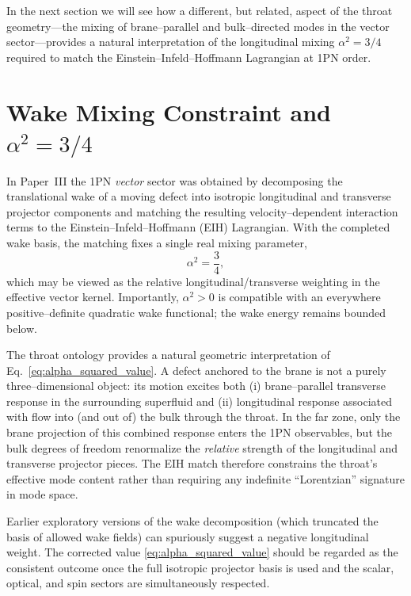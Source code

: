 \documentclass[12pt]{article}
\begin{document}
In the next section we will see how a different, but related, aspect of the
throat geometry---the mixing of brane--parallel and bulk--directed modes in
the vector sector---provides a natural interpretation of the longitudinal
mixing $\alpha^2=3/4$ required to match the Einstein--Infeld--Hoffmann
Lagrangian at 1PN order.

\section{Wake Mixing Constraint and \texorpdfstring{$\alpha^2 = 3/4$}{alpha squared = 3/4}}
\label{sec:wake_mixing_constraint}

In Paper~III the 1PN \emph{vector} sector was obtained by decomposing the
translational wake of a moving defect into isotropic longitudinal and
transverse projector components and matching the resulting velocity--dependent
interaction terms to the Einstein--Infeld--Hoffmann (EIH) Lagrangian.
With the completed wake basis, the matching fixes a single real mixing
parameter,
\begin{equation}
  \alpha^2 = \frac{3}{4},
  \label{eq:alpha_squared_value}
\end{equation}
which may be viewed as the relative longitudinal/transverse weighting in the
effective vector kernel.  Importantly, $\alpha^2>0$ is compatible with an
everywhere positive--definite quadratic wake functional; the wake energy
remains bounded below.

The throat ontology provides a natural geometric interpretation of
Eq.~\eqref{eq:alpha_squared_value}.  A defect anchored to the brane is not a
purely three--dimensional object: its motion excites both (i) brane--parallel
transverse response in the surrounding superfluid and (ii) longitudinal
response associated with flow into (and out of) the bulk through the throat.
In the far zone, only the brane projection of this combined response enters
the 1PN observables, but the bulk degrees of freedom renormalize the
\emph{relative} strength of the longitudinal and transverse projector pieces.
The EIH match therefore constrains the throat's effective mode content rather
than requiring any indefinite ``Lorentzian'' signature in mode space.

Earlier exploratory versions of the wake decomposition (which truncated the
basis of allowed wake fields) can spuriously suggest a negative longitudinal
weight.  The corrected value \eqref{eq:alpha_squared_value} should be regarded
as the consistent outcome once the full isotropic projector basis is used and
the scalar, optical, and spin sectors are simultaneously respected.
\end{document}
